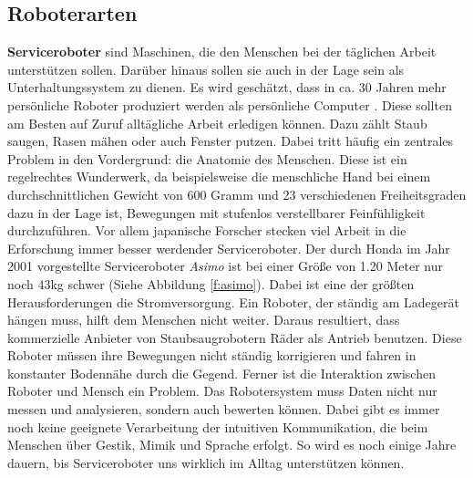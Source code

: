 \subsection{Roboterarten}
\textbf{Serviceroboter} sind Maschinen, die den Menschen bei der täglichen Arbeit unterstützen sollen. Darüber hinaus sollen sie auch in der Lage sein als Unterhaltungssystem zu dienen. Es wird geschätzt, dass in ca. 30 Jahren mehr persönliche Roboter produziert werden als persönliche Computer \cite{Haun2007}.
Diese sollten am Besten auf Zuruf alltägliche Arbeit erledigen können. Dazu zählt Staub saugen, Rasen mähen oder auch Fenster putzen. Dabei tritt häufig ein zentrales Problem in den Vordergrund: die Anatomie des Menschen. Diese ist ein regelrechtes Wunderwerk, da beispielsweise die menschliche Hand bei einem durchschnittlichen Gewicht von 600 Gramm und 23 verschiedenen Freiheitsgraden dazu in der Lage ist, Bewegungen mit stufenlos verstellbarer Feinfühligkeit durchzuführen. Vor allem japanische Forscher stecken viel Arbeit in die Erforschung immer besser werdender Serviceroboter. Der durch Honda im Jahr 2001 vorgestellte Serviceroboter \textit{Asimo} ist bei einer Größe von 1.20 Meter nur noch 43kg schwer (Siehe Abbildung \ref{f:asimo}).
Dabei ist eine der größten Herausforderungen die Stromversorgung. Ein Roboter, der ständig am Ladegerät hängen muss, hilft dem Menschen nicht weiter. Daraus resultiert, dass kommerzielle Anbieter von Staubsaugrobotern Räder als Antrieb benutzen. Diese Roboter müssen ihre Bewegungen nicht ständig korrigieren und fahren in konstanter Bodennähe durch die Gegend. Ferner ist die Interaktion zwischen Roboter und Mensch ein Problem. Das Robotersystem muss Daten nicht nur messen und analysieren, sondern auch bewerten können. Dabei gibt es immer noch keine geeignete Verarbeitung der intuitiven Kommunikation, die beim Menschen über Gestik, Mimik und Sprache erfolgt. So wird es noch einige Jahre dauern, bis Serviceroboter uns wirklich im Alltag unterstützen können.

